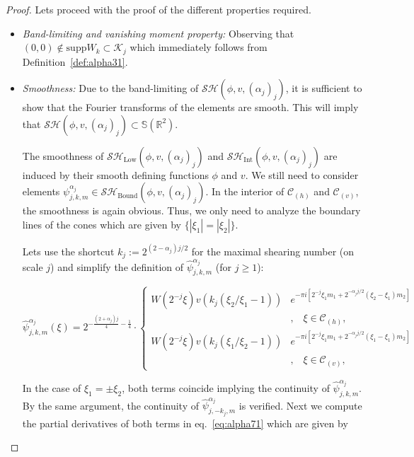 \begin{proof}
Lets proceed with the proof of the different properties required.
\begin{itemize}
\item\textit{Band-limiting and vanishing moment property:} Observing that $(0,0)\notin \text{supp}W_k\subset \mathcal{K}_j$ which immediately follows from Definition~\ref{def:alpha31}.
\item\textit{Smoothness:} Due to the band-limiting of $\mathcal{SH}(\phi,v,(\alpha_j)_j)$, it is sufficient to show that the Fourier transforms of the elements are smooth. This will imply that $\mathcal{SH}(\phi,v,(\alpha_j)_j)\subset \mathbb{S}(\mathbb{R}^2)$. 

\bigskip

The smoothness of $\mathcal{SH}_{\text{Low}}(\phi,v,(\alpha_j)_j)$ and $\mathcal{SH}_{\text{Int}}(\phi,v,(\alpha_j)_j)$ are induced by their smooth defining functions $\phi$ and $v$. We still need to consider elements $\psi^{\alpha_j}_{j,k,m}\in\mathcal{SH}_{\text{Bound}}(\phi,v,(\alpha_j)_j)$. In the interior of $\mathcal{C}_{(h)}$ and $\mathcal{C}_{(v)}$, the smoothness is again obvious. Thus, we only need to analyze the boundary lines of the cones which are given by $\{|\xi_1|=|\xi_2|\}$.

\bigskip

Lets use the shortcut $k_j:=2^{(2-\alpha_j)j/2}$ for the maximal shearing number (on scale $j$) and simplify the definition of $\hat{\psi}_{j,k,m}^{\alpha_j}$ (for $j\geq 1$):

\begin{equation}
\label{eq:alpha71}
\hat{\psi}^{\alpha_j}_{j,k,m}(\xi)=2^{-\frac{(2+\alpha_j)j}{4}-\frac{1}{4}}\cdot
\begin{cases}
W(2^{-j}\xi)v(k_j(\xi_2/\xi_1-1))&e^{-\pi i[2^{-j}\xi_1 m_1+2^{-\alpha_j j/2}(\xi_2-\xi_1)m_2]}\\
& \textrm{,}\quad \xi\in\mathcal{C}_{(h)},\\
W(2^{-j}\xi)v(k_j(\xi_1/\xi_2-1))&e^{-\pi i[2^{-j}\xi_1 m_1+2^{-\alpha_j j/2}(\xi_1-\xi_1)m_2]}\\
&\textrm{,}\quad \xi\in\mathcal{C}_{(v)},
\end{cases}
\end{equation}

In the case of $\xi_1=\pm \xi_2$, both terms coincide implying the continuity of $\hat{\psi}_{j,k,m}^{\alpha_j}$. By the same argument, the continuity of $\hat{\psi}_{j,-k_j,m}^{\alpha_j}$ is verified. Next we compute the partial derivatives of both terms in eq.~\ref{eq:alpha71} which are given by


\end{itemize}
\end{proof}
